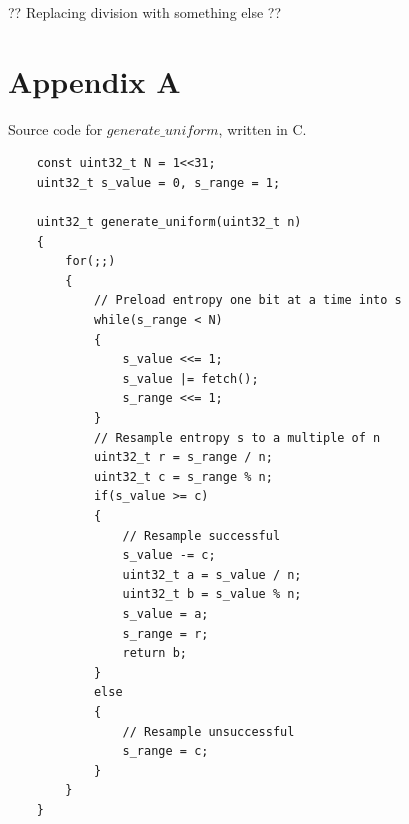 \documentclass[12pt]{article}
\begin{document}
?? Replacing division with something else ??

\printbibliography

\section {Appendix A}
Source code for $generate\_uniform$, written in C.

\begin{verbatim}
    const uint32_t N = 1<<31;
    uint32_t s_value = 0, s_range = 1;

    uint32_t generate_uniform(uint32_t n)
    {
        for(;;)
        {
            // Preload entropy one bit at a time into s
            while(s_range < N)
            {
                s_value <<= 1;
                s_value |= fetch();
                s_range <<= 1;
            }
            // Resample entropy s to a multiple of n
            uint32_t r = s_range / n;
            uint32_t c = s_range % n;
            if(s_value >= c)
            {
                // Resample successful
                s_value -= c;
                uint32_t a = s_value / n;
                uint32_t b = s_value % n;
                s_value = a;
                s_range = r; 
                return b;
            }
            else
            {
                // Resample unsuccessful
                s_range = c;
            }
        }
    }
\end{verbatim}
\end{document}
